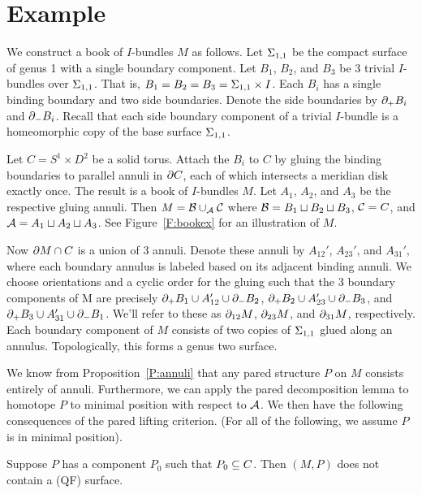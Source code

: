 \section{Example}

We construct a book of $I$-bundles $M$ as follows. Let $\Sigma_{1,1}$ be the
compact surface of genus 1 with a single boundary component. Let $B_1$, $B_2$,
and $B_3$ be 3 trivial $I$-bundles over $\Sigma_{1,1}$. That is,
$B_1=B_2=B_3=\Sigma_{1,1}\times I$.  Each $B_i$ has a single binding boundary and two
side boundaries. Denote the side boundaries by $\partial_+B_i$ and $\partial_-B_i$.
Recall that each side boundary component of a trivial $I$-bundle is
a homeomorphic copy of the base surface $\Sigma_{1,1}$.

Let $C = S^1\times D^2$ be a solid torus. Attach the $B_i$ to $C$ by gluing the
binding boundaries to parallel annuli in $\partial C$, each of which intersects
a meridian disk exactly once. The result is a book of $I$-bundles $M$. Let
$A_1$, $A_2$, and $A_3$ be the respective gluing annuli. Then $M=\mathcal{B}\cup_{\mathcal{A}}
\mathcal{C}$ where $\mathcal{B}=B_1 \sqcup B_2 \sqcup B_3$, $\mathcal{C}=C$, and $\mathcal{A} = A_1 \sqcup A_2
\sqcup A_3$. See Figure~\ref{F:bookex} for an illustration of $M$.


Now $\partial M \cap C$ is a union of 3 annuli. Denote these annuli by $A_{12}'$,
$A_{23}'$, and $A_{31}'$, where each boundary annulus is labeled based on its
adjacent binding annuli. We choose orientations and a cyclic order for the
gluing such that the 3 boundary components of M are precisely $\partial_+B_1 \cup
A_{12}' \cup \partial_-B_2$, $\partial_+B_2 \cup A_{23}' \cup \partial_-B_3$, and $\partial_+B_3
\cup A_{31}' \cup \partial_-B_1$. We'll refer to these as $\partial_{12}M$, $\partial_{23}M$,
and $\partial_{31}M$, respectively.  Each boundary component of $M$ consists of two
copies of $\Sigma_{1,1}$ glued along an annulus. Topologically, this forms a genus
two surface.

We know from Proposition~\ref{P:annuli} that any pared structure $P$ on $M$
consists entirely of annuli. Furthermore, we can apply the pared decomposition
lemma to homotope $P$ to minimal position with respect to $\mathcal{A}$. We then have
the following consequences of the pared lifting criterion. (For all of the
following, we assume $P$ is in minimal position).

\begin{prop}

Suppose $P$ has a component $P_0$ such that $P_0 \subseteq C$. Then $(M,P)$ does not
contain a (QF) surface.

\end{prop}

